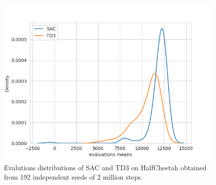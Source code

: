 \documentclass{article}
\theoremstyle{plain}
\theoremstyle{remark}
\newcommand{\1}{\mathbbm{1}}
\numberwithin{equation}{section}
\begin{document}
\begin{figure}
	\begin{centering}
		\includegraphics[scale=0.5]{sac_vs_td3_hc.png}
		\caption{Evalutions distributions of SAC and TD3 on HalfCheetah obtained from 192 independent seeds of 2 million steps. \label{fig:sactd3}}
	\end{centering}
\end{figure}
\end{document}
